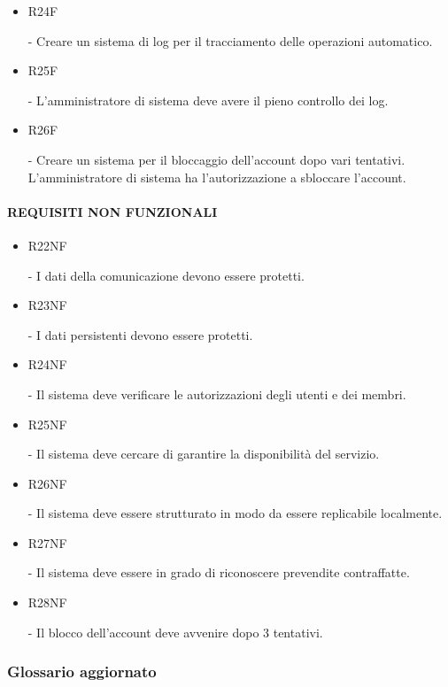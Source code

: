 \documentclass[a4paper]{article}
\begin{document}
\begin{itemize}
    \item \hypertarget{R24F}{R24F} - Creare un sistema di log per il tracciamento delle operazioni automatico.
    \item \hypertarget{R25F}{R25F} - L'amministratore di sistema deve avere il pieno controllo dei log.
    \item \hypertarget{R26F}{R26F} - Creare un sistema per il bloccaggio dell'account dopo vari tentativi. L'amministratore di sistema ha l'autorizzazione a sbloccare l'account.
\end{itemize}

\paragraph{REQUISITI NON FUNZIONALI}

\begin{itemize}
    \item \hypertarget{R22NF}{R22NF} - I dati della comunicazione devono essere protetti.
    \item \hypertarget{R23NF}{R23NF} - I dati persistenti devono essere protetti.
    \item \hypertarget{R24NF}{R24NF} - Il sistema deve verificare le autorizzazioni degli utenti e dei membri.
    \item \hypertarget{R25NF}{R25NF} - Il sistema deve cercare di garantire la disponibilità del servizio.
    \item \hypertarget{R26NF}{R26NF} - Il sistema deve essere strutturato in modo da essere replicabile localmente.
    \item \hypertarget{R27NF}{R27NF} - Il sistema deve essere in grado di riconoscere prevendite contraffatte.
    \item \hypertarget{R28NF}{R28NF} - Il blocco dell'account deve avvenire dopo 3 tentativi.
\end{itemize}


\subsubsection{Glossario aggiornato}
\end{document}
